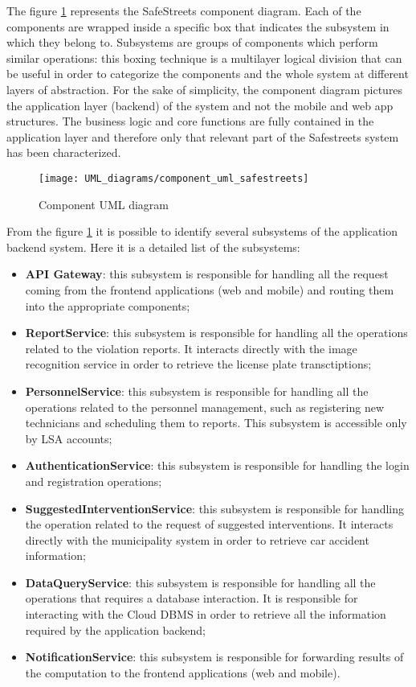 The figure \ref{fig:component_diagram} represents the SafeStreets component diagram. Each of the components are wrapped inside a specific box that indicates the subsystem in which they belong to.
\newline Subsystems are groups of components which perform similar operations: this boxing technique is a multilayer logical division that can be useful in order to categorize the components and the whole system at different layers of abstraction.
\newline For the sake of simplicity, the component diagram pictures the application layer (backend) of the system and not the mobile and web app structures. The business logic and core functions are fully contained in the application layer and therefore only that relevant part of the Safestreets system has been characterized.
\begin{figure}[H]
    \centering
    \texttt{[image: UML\_diagrams/component\_uml\_safestreets]}
    \caption{Component UML diagram}
    \label{fig:component_diagram}
\end{figure}
From the figure \ref{fig:component_diagram} it is possible to identify several subsystems of the application backend system. Here it is a detailed list of the subsystems:
\begin{itemize}
    \item \textbf{API Gateway}: this subsystem is responsible for handling all the request coming from the frontend applications (web and mobile) and routing them into the appropriate components;
    \item \textbf{ReportService}: this subsystem is responsible for handling all the operations related to the violation reports. It interacts directly with the image recognition service in order to retrieve the license plate transctiptions;
    \item \textbf{PersonnelService}: this subsystem is responsible for handling all the operations related to the personnel management, such as registering new technicians and scheduling them to reports. This subsystem is accessible only by LSA accounts;
    \item \textbf{AuthenticationService}: this subsystem is responsible for handling the login and registration operations;
    \item \textbf{SuggestedInterventionService}: this subsystem is responsible for handling the operation related to the request of suggested interventions. It interacts directly with the municipality system in order to retrieve car accident information;
    \item \textbf{DataQueryService}: this subsystem is responsible for handling all the operations that requires a database interaction. It is responsible for interacting with the Cloud DBMS in order to retrieve all the information required by the application backend;
    \item \textbf{NotificationService}: this subsystem is responsible for forwarding results of the computation to the frontend applications (web and mobile).
\end{itemize} 

